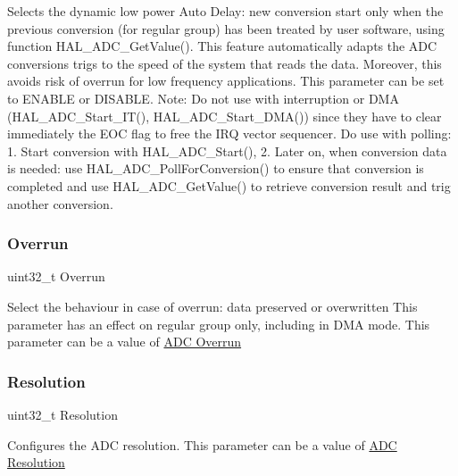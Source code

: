 Selects the dynamic low power Auto Delay\+: new conversion start only when the previous conversion (for regular group) has been treated by user software, using function H\+A\+L\+\_\+\+A\+D\+C\+\_\+\+Get\+Value(). This feature automatically adapts the A\+DC conversions trigs to the speed of the system that reads the data. Moreover, this avoids risk of overrun for low frequency applications. This parameter can be set to E\+N\+A\+B\+LE or D\+I\+S\+A\+B\+LE. Note\+: Do not use with interruption or D\+MA (H\+A\+L\+\_\+\+A\+D\+C\+\_\+\+Start\+\_\+\+I\+T(), H\+A\+L\+\_\+\+A\+D\+C\+\_\+\+Start\+\_\+\+D\+M\+A()) since they have to clear immediately the E\+OC flag to free the I\+RQ vector sequencer. Do use with polling\+: 1. Start conversion with H\+A\+L\+\_\+\+A\+D\+C\+\_\+\+Start(), 2. Later on, when conversion data is needed\+: use H\+A\+L\+\_\+\+A\+D\+C\+\_\+\+Poll\+For\+Conversion() to ensure that conversion is completed and use H\+A\+L\+\_\+\+A\+D\+C\+\_\+\+Get\+Value() to retrieve conversion result and trig another conversion. \mbox{\label{struct_a_d_c___init_type_def_ac20c5da6d0ffd3de9c705eff0f5a13bc}} 
\subsubsection{\texorpdfstring{Overrun}{Overrun}}
{\footnotesize\ttfamily uint32\+\_\+t Overrun}

Select the behaviour in case of overrun\+: data preserved or overwritten This parameter has an effect on regular group only, including in D\+MA mode. This parameter can be a value of \hyperlink{group___a_d_c___overrun}{A\+DC Overrun} \mbox{\label{struct_a_d_c___init_type_def_a6613985e603e784c30fb3689f2c6fa5f}} 
\subsubsection{\texorpdfstring{Resolution}{Resolution}}
{\footnotesize\ttfamily uint32\+\_\+t Resolution}

Configures the A\+DC resolution. This parameter can be a value of \hyperlink{group___a_d_c___resolution}{A\+DC Resolution} \mbox{\label{struct_a_d_c___init_type_def_a66567dbf0cd76f9d381c9f1d5994c7ed}} 
